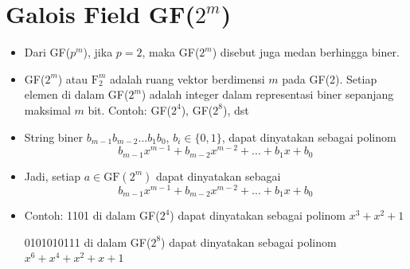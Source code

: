 \documentclass{article}
\begin{document}

\section*{Galois Field GF($2^m$)}

\begin{itemize}
    \item Dari GF($p^m$), jika $p = 2$, maka GF($2^m$) disebut juga medan berhingga biner.
    \item GF($2^m$) atau $\text{F}_2^m$ adalah ruang vektor berdimensi $m$ pada GF(2). Setiap elemen di dalam GF($2^m$) adalah integer dalam representasi biner sepanjang maksimal $m$ bit.
    Contoh: GF($2^4$), GF($2^8$), dst
    \item String biner $b_{m-1}b_{m-2} \dots b_1b_0$, $b_i \in \{0,1\}$, dapat dinyatakan sebagai polinom
    \[ b_{m-1}x^{m-1} + b_{m-2}x^{m-2} + \dots + b_1x + b_0 \]
    \item Jadi, setiap $a \in \text{GF}(2^m)$ dapat dinyatakan sebagai
    \[ b_{m-1}x^{m-1} + b_{m-2}x^{m-2} + \dots + b_1x + b_0 \]
    \item Contoh: 1101 di dalam GF($2^4$) dapat dinyatakan sebagai polinom $x^3 + x^2 + 1$
    
    0101010111 di dalam GF($2^8$) dapat dinyatakan sebagai polinom $x^6 + x^4 + x^2 + x + 1$
\end{itemize}
\end{document}
